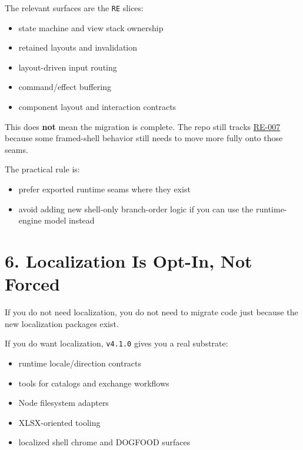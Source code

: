The relevant surfaces are the \texttt{R\allowbreak{}E} slices:

\begin{itemize}
\tightlist
\item
  state machine and view stack ownership
\item
  retained layouts and invalidation
\item
  layout-driven input routing
\item
  command/effect buffering
\item
  component layout and interaction contracts
\end{itemize}

This does \textbf{not} mean the migration is complete. The repo still tracks \href{https://github.com/flyingrobots/bijou/blob/cbd70612140e7a450d764b3c7be1c6af878b99bc/docs/method/graveyard/legacy-backlog/up-next/RE-007-migrate-framed-shell-onto-runtime-engine-seams.md}{RE-007} because some framed-shell behavior still needs to move more fully onto those seams.

The practical rule is:

\begin{itemize}
\tightlist
\item
  prefer exported runtime seams where they exist
\item
  avoid adding new shell-only branch-order logic if you can use the runtime-engine model instead
\end{itemize}

\section{6. Localization Is Opt-In, Not Forced}\label{record-264-localization-is-opt-in-not-forced}

If you do not need localization, you do not need to migrate code just because the new localization packages exist.

If you do want localization, \texttt{v\allowbreak{}4\allowbreak{}.\allowbreak{}1\allowbreak{}.\allowbreak{}0} gives you a real substrate:

\begin{itemize}
\tightlist
\item
  runtime locale/direction contracts
\item
  tools for catalogs and exchange workflows
\item
  Node filesystem adapters
\item
  XLSX-oriented tooling
\item
  localized shell chrome and DOGFOOD surfaces
\end{itemize}


